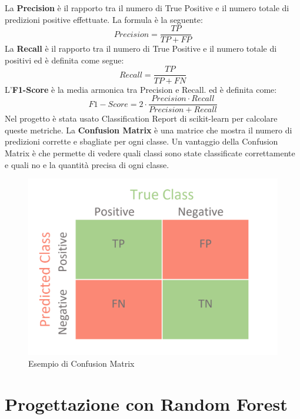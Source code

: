 \documentclass[12pt,a4paper,openright,twoside]{book}
\begin{document}
\noindent La \textbf{Precision} è il rapporto tra il numero di True Positive 
e il numero totale di predizioni positive effettuate.
La formula è la seguente:
\begin{equation}
    Precision = \frac{TP}{TP + FP}
\end{equation}
La \textbf{Recall} è il rapporto tra il numero di True Positive
e il numero totale di positivi ed è definita come segue:
\begin{equation}
    Recall = \frac{TP}{TP + FN}
\end{equation}
L'\textbf{F1-Score} è la media armonica tra Precision e Recall.
ed è definita come:
\begin{equation}
    F1-Score = 2 \cdot \frac{Precision \cdot Recall}{Precision + Recall}
\end{equation}
Nel progetto è stata usato Classification Report di scikit-learn
per calcolare queste metriche.
La \textbf{Confusion Matrix} è una matrice che mostra il numero di predizioni
corrette e sbagliate per ogni classe. Un vantaggio
della Confusion Matrix è che permette di vedere
quali classi sono state classificate correttamente e quali no e la quantità precisa di ogni classe.
\begin{figure}[H]
    \centering
    \includegraphics[width=0.6\linewidth]{figures/confusion-matrix.png}
    \caption{Esempio di Confusion Matrix \cite{confusion_matrix_image}}
    \label{fig:confusion matrix}
\end{figure}

\section{Progettazione con Random Forest}
\end{document}
